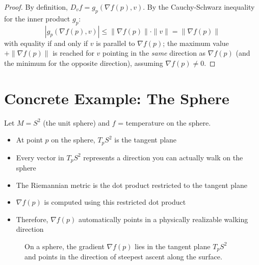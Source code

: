 \begin{notechapter}
\begin{proof}
By definition, $D_v f = g_p(\nabla f(p), v)$. By the Cauchy-Schwarz inequality for the inner product $g_p$:
\[
|g_p(\nabla f(p), v)| \leq \|\nabla f(p)\| \cdot \|v\| = \|\nabla f(p)\|
\]
with equality if and only if $v$ is parallel to $\nabla f(p)$; the maximum value $+\|\nabla f(p)\|$ is reached for $v$ pointing in the \emph{same} direction as $\nabla f(p)$ (and the minimum for the opposite direction), assuming $\nabla f(p) \neq 0$.
\end{proof}

\section{Concrete Example: The Sphere}

Let $M = S^2$ (the unit sphere) and $f$ = temperature on the sphere.

\begin{itemize}
\item At point $p$ on the sphere, $T_p S^2$ is the tangent plane
\item Every vector in $T_p S^2$ represents a direction you can actually walk on the sphere
\item The Riemannian metric is the dot product restricted to the tangent plane
\item $\nabla f(p)$ is computed using this restricted dot product
\item Therefore, $\nabla f(p)$ automatically points in a physically realizable walking direction
\end{itemize}

\begin{figure}[h]
\centering
{}
\caption{On a sphere, the gradient $\nabla f(p)$ lies in the tangent plane $T_p S^2$ and points in the direction of steepest ascent along the surface.}
\end{figure}


\end{notechapter}
